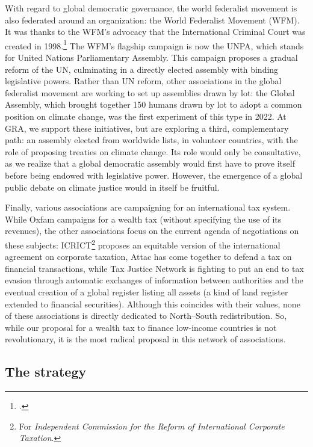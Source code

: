 \documentclass[a5paper,english,openany]{memoir}
\begin{document}
With regard to global democratic governance, the world federalist movement is also federated around an organization: the World Federalist Movement (WFM). It was thanks to the WFM's advocacy that the International Criminal Court was created in 1998.\footnote{\citet{schiff_building_2008}.} 
The WFM's flagship campaign is now the UNPA, which stands for United Nations Parliamentary Assembly. This campaign proposes a gradual reform of the UN, culminating in a directly elected assembly with binding legislative powers. Rather than UN reform, other associations in the global federalist movement are working to set up assemblies drawn by lot: the Global Assembly, which brought together 150 humans drawn by lot to adopt a common position on climate change, was the first experiment of this type in 2022. 
At GRA, we support these initiatives, but are exploring a third, complementary path: 
an assembly elected from worldwide lists, in volunteer countries, with the role of proposing treaties on climate change. 
Its role would only be consultative, as we realize that a global democratic assembly would first have to prove itself before being endowed with legislative power. However, the emergence of a global public debate on climate justice would in itself be fruitful. 

Finally, various associations are campaigning for an international tax system. While Oxfam campaigns for a wealth tax (without specifying the use of its revenues), the other associations focus on the current agenda of negotiations on these subjects: ICRICT\footnote{For \textit{Independent Commission for the Reform of International Corporate Taxation}.} 
proposes an equitable version of the international agreement on corporate taxation, Attac has come together to defend a tax on financial transactions, while Tax Justice Network is fighting to put an end to tax evasion through automatic exchanges of information between authorities and the eventual creation of a global register listing all assets (a kind of land register extended to financial securities). Although this coincides with their values, none of these associations is directly dedicated to North--South redistribution. So, while our proposal for a wealth tax to finance low-income countries is not revolutionary, it is the most radical proposal in this network of associations. 

\subsection{The strategy}
\end{document}
